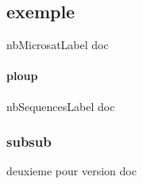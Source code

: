 \documentclass[a4paper]{article}
\begin{document}
        \subsection{exemple}
        \label{doc_nbMicrosatLabel}
        nbMicrosatLabel doc
            \paragraph{ploup}
            \label{doc_nbSequencesLabel}
            nbSequencesLabel doc

            \subsubsection{subsub}
            \label{doc_versionLabel+++plip}
            deuxieme pour version doc
\end{document}
